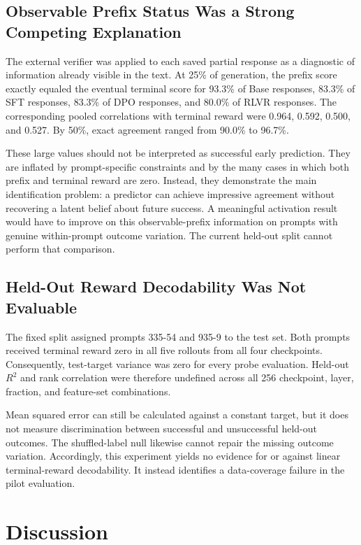 \documentclass[manuscript,screen,nonacm]{acmart}
\begin{document}
\subsection{Observable Prefix Status Was a Strong Competing Explanation}

The external verifier was applied to each saved partial response as a diagnostic
of information already visible in the text. At 25\% of generation, the prefix
score exactly equaled the eventual terminal score for 93.3\% of Base responses,
83.3\% of SFT responses, 83.3\% of DPO responses, and 80.0\% of RLVR responses.
The corresponding pooled correlations with terminal reward were 0.964, 0.592,
0.500, and 0.527. By 50\%, exact agreement ranged from 90.0\% to 96.7\%.

These large values should not be interpreted as successful early prediction.
They are inflated by prompt-specific constraints and by the many cases in which
both prefix and terminal reward are zero. Instead, they demonstrate the main
identification problem: a predictor can achieve impressive agreement without
recovering a latent belief about future success. A meaningful activation result
would have to improve on this observable-prefix information on prompts with
genuine within-prompt outcome variation. The current held-out split cannot
perform that comparison.

\subsection{Held-Out Reward Decodability Was Not Evaluable}

The fixed split assigned prompts 335-54 and 935-9 to the test set. Both prompts
received terminal reward zero in all five rollouts from all four checkpoints.
Consequently, test-target variance was zero for every probe evaluation.
Held-out $R^2$ and rank correlation were therefore undefined across all 256
checkpoint, layer, fraction, and feature-set combinations.

Mean squared error can still be calculated against a constant target, but it
does not measure discrimination between successful and unsuccessful held-out
outcomes. The shuffled-label null likewise cannot repair the missing outcome
variation. Accordingly, this experiment yields no evidence for or against
linear terminal-reward decodability. It instead identifies a data-coverage
failure in the pilot evaluation.

\section{Discussion}
\end{document}
